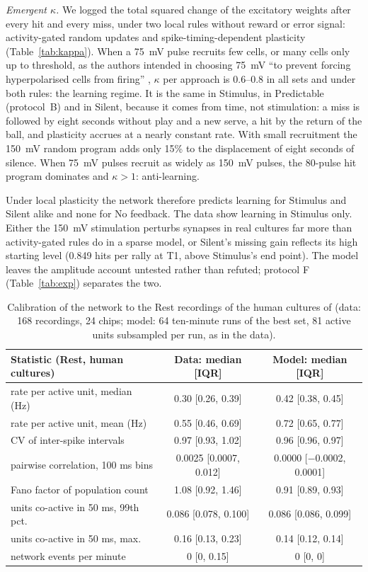 \documentclass[12pt]{article}
\numberwithin{equation}{section}
\begin{document}
\emph{Emergent $\kappa$.} We logged the total squared change of the excitatory weights after every hit and every miss, under two local rules without reward or error signal: activity-gated random updates and spike-timing-dependent plasticity (Table~\ref{tab:kappa}). When a 75~mV pulse recruits few cells, or many cells only up to threshold, as the authors intended in choosing 75~mV ``to prevent forcing hyperpolarised cells from firing'' \citep{Kagan2022}, $\kappa$ per approach is $0.6$--$0.8$ in all sets and under both rules: the learning regime. It is the same in Stimulus, in Predictable (protocol~B) and in Silent, because it comes from time, not stimulation: a miss is followed by eight seconds without play and a new serve, a hit by the return of the ball, and plasticity accrues at a nearly constant rate. With small recruitment the 150~mV random program adds only 15\% to the displacement of eight seconds of silence. When 75~mV pulses recruit as widely as 150~mV pulses, the 80-pulse hit program dominates and $\kappa>1$: anti-learning.

Under local plasticity the network therefore predicts learning for Stimulus and Silent alike and none for No feedback. The data show learning in Stimulus only. Either the 150~mV stimulation perturbs synapses in real cultures far more than activity-gated rules do in a sparse model, or Silent's missing gain reflects its high starting level (0.849 hits per rally at T1, above Stimulus's end point). The model leaves the amplitude account untested rather than refuted; protocol F (Table~\ref{tab:exp}) separates the two.

\begin{table}[t]
\centering\small
\begin{tabular}{lcc}
\toprule
Statistic (Rest, human cultures) & Data: median [IQR] & Model: median [IQR] \\
\midrule
rate per active unit, median (Hz) & 0.30 [0.26, 0.39] & 0.42 [0.38, 0.45] \\
rate per active unit, mean (Hz) & 0.55 [0.46, 0.69] & 0.72 [0.65, 0.77] \\
CV of inter-spike intervals & 0.97 [0.93, 1.02] & 0.96 [0.96, 0.97] \\
pairwise correlation, 100 ms bins & 0.0025 [0.0007, 0.012] & 0.0000 [$-$0.0002, 0.0001] \\
Fano factor of population count & 1.08 [0.92, 1.46] & 0.91 [0.89, 0.93] \\
units co-active in 50 ms, 99th pct. & 0.086 [0.078, 0.100] & 0.086 [0.086, 0.099] \\
units co-active in 50 ms, max. & 0.16 [0.13, 0.23] & 0.14 [0.12, 0.14] \\
network events per minute & 0 [0, 0.15] & 0 [0, 0] \\
\bottomrule
\end{tabular}
\caption{Calibration of the network to the Rest recordings of the human cultures of \citet{Kagan2022} (data: 168 recordings, 24 chips; model: 64 ten-minute runs of the best set, 81 active units subsampled per run, as in the data).}
\label{tab:calib}
\end{table}
\end{document}
